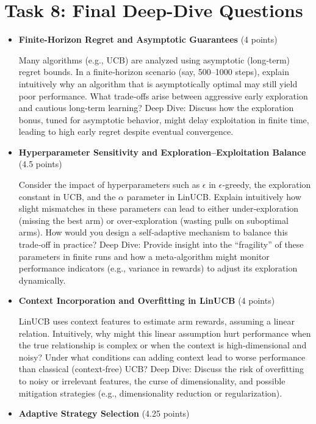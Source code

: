 \documentclass[12pt]{article}
\begin{document}
{{{\section{Task 8: Final Deep-Dive Questions}
\begin{itemize}[noitemsep]
    \item \textbf{Finite-Horizon Regret and Asymptotic Guarantees} (4 points)
    
    \vspace{0.25cm}
    Many algorithms (e.g., UCB) are analyzed using asymptotic (long‑term) regret bounds. In a finite‑horizon scenario (say, 500–1000 steps), explain intuitively why an algorithm that is asymptotically optimal may still yield poor performance. What trade‑offs arise between aggressive early exploration and cautious long‑term learning?
    Deep Dive:
    Discuss how the exploration bonus, tuned for asymptotic behavior, might delay exploitation in finite time, leading to high early regret despite eventual convergence.
    \vspace{0.5cm}
    \item \textbf{Hyperparameter Sensitivity and Exploration–Exploitation Balance} (4.5 points)

    \vspace{0.25cm}
    Consider the impact of hyperparameters such as $\epsilon$ in $\epsilon$‑greedy, the exploration constant in UCB, and the $\alpha$ parameter in LinUCB. Explain intuitively how slight mismatches in these parameters can lead to either under‑exploration (missing the best arm) or over‑exploration (wasting pulls on suboptimal arms). How would you design a self‑adaptive mechanism to balance this trade‑off in practice?
    Deep Dive:
    Provide insight into the “fragility” of these parameters in finite runs and how a meta‑algorithm might monitor performance indicators (e.g., variance in rewards) to adjust its exploration dynamically.
    \vspace{0.5cm}
    
    \newpage
    
    \item \textbf{Context Incorporation and Overfitting in LinUCB} (4 points)

    \vspace{0.25cm}
    LinUCB uses context features to estimate arm rewards, assuming a linear relation. Intuitively, why might this linear assumption hurt performance when the true relationship is complex or when the context is high‑dimensional and noisy? Under what conditions can adding context lead to worse performance than classical (context‑free) UCB?
    Deep Dive:
    Discuss the risk of overfitting to noisy or irrelevant features, the curse of dimensionality, and possible mitigation strategies (e.g., dimensionality reduction or regularization).
    \vspace{0.5cm}
    \item \textbf{Adaptive Strategy Selection} (4.25 points)


\end{itemize}}}}
\end{document}
